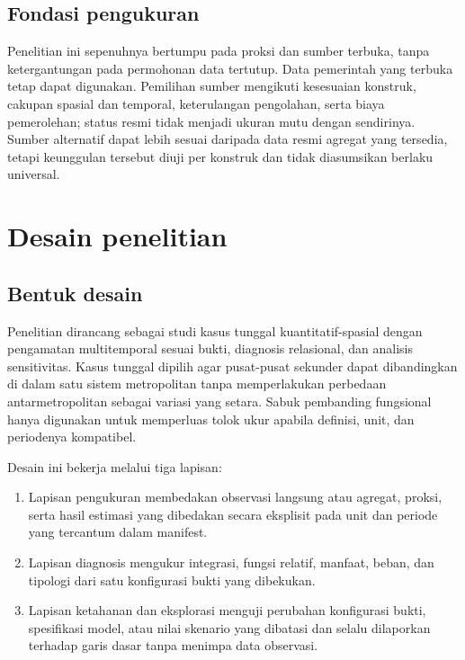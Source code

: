 \documentclass[11pt,a4paper,oneside,openany,indonesian]{report}
\begin{document}
\subsection{Fondasi pengukuran}\label{fondasi-pengukuran}

Penelitian ini sepenuhnya bertumpu pada proksi dan sumber terbuka, tanpa
ketergantungan pada permohonan data tertutup. Data pemerintah yang
terbuka tetap dapat digunakan. Pemilihan sumber mengikuti kesesuaian
konstruk, cakupan spasial dan temporal, keterulangan pengolahan, serta
biaya pemerolehan; status resmi tidak menjadi ukuran mutu dengan
sendirinya. Sumber alternatif dapat lebih sesuai daripada data resmi
agregat yang tersedia, tetapi keunggulan tersebut diuji per konstruk dan
tidak diasumsikan berlaku universal.

\section{Desain penelitian}\label{desain-penelitian}

\subsection{Bentuk desain}\label{bentuk-desain}

Penelitian dirancang sebagai studi kasus tunggal kuantitatif-spasial
dengan pengamatan multitemporal sesuai bukti, diagnosis relasional, dan
analisis sensitivitas. Kasus tunggal dipilih agar pusat-pusat sekunder
dapat dibandingkan di dalam satu sistem metropolitan tanpa memperlakukan
perbedaan antarmetropolitan sebagai variasi yang setara. Sabuk
pembanding fungsional hanya digunakan untuk memperluas tolok ukur
apabila definisi, unit, dan periodenya kompatibel.

Desain ini bekerja melalui tiga lapisan:

\begin{enumerate}
\def\labelenumi{\arabic{enumi}.}
\tightlist
\item
  Lapisan pengukuran membedakan observasi langsung atau agregat, proksi,
  serta hasil estimasi yang dibedakan secara eksplisit pada unit dan
  periode yang tercantum dalam manifest.
\item
  Lapisan diagnosis mengukur integrasi, fungsi relatif,
  manfaat, beban, dan tipologi dari satu konfigurasi bukti yang
  dibekukan.
\item
  Lapisan ketahanan dan eksplorasi menguji perubahan konfigurasi
  bukti, spesifikasi model, atau nilai skenario yang dibatasi dan selalu
  dilaporkan terhadap garis dasar tanpa menimpa data observasi.
\end{enumerate}
\end{document}

